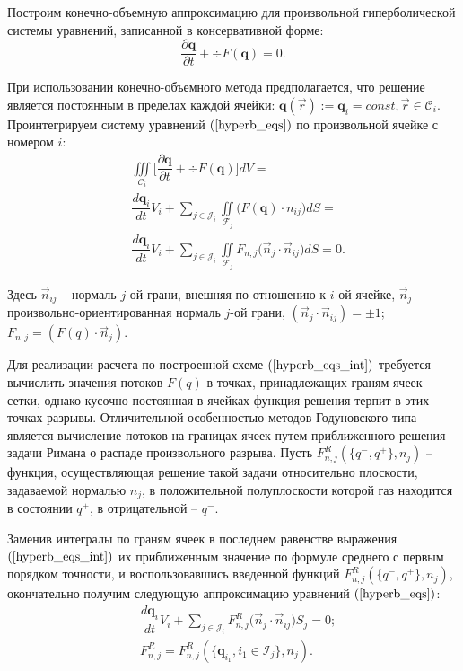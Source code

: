 \documentclass[14pt, a4paper, fleqn]{extreport}
\begin{document}
	Построим конечно-объемную аппроксимацию для
	произвольной гиперболической системы уравнений, записанной в консервативной форме:
	\begin{equation}
		\label{hyperb_eqs}
		\dfrac{\partial \textbf{q}}{\partial t} + \div{F(\textbf{q})} = 0.
	\end{equation}
	
	При использовании конечно-объемного метода предполагается, что решение является 
	постоянным в пределах каждой ячейки: $\textbf{q}(\vec{r}) := \textbf{q}_i = const, \vec{r} \in \mathcal{C}_i$.
	Проинтегрируем систему уравнений $(\ref{hyperb_eqs})$ по произвольной ячейке с номером $i$:
	\begin{equation}
	\label{hyperb_eqs_int}
	\begin{split}
		&\iiint\limits_{\mathcal{C}_i} \Big[
			\dfrac{\partial \textbf{q}}{\partial t} + \div{F(\textbf{q})} \Big]dV = 
		\\
		&\dfrac{d \textbf{q}_i}{d t}V_i
			+ \sum\limits_{j \in \mathcal{J}_i}\iint\limits_{\mathcal{F}_j} \Big( F(\textbf{q}) \cdot n_{ij} \Big) dS =
		\\
		&\dfrac{d \textbf{q}_i}{d t}V_i
			+ \sum\limits_{j \in \mathcal{J}_i}\iint\limits_{\mathcal{F}_j} 
				F_{n,j} \Big( \vec{n}_{j} \cdot \vec{n}_{ij} \Big) dS = 0.
	\end{split}
	\end{equation}
	
	Здесь $\vec{n}_{ij}$ -- нормаль $j$-ой грани, внешняя по отношению к $i$-ой ячейке, 
	$\vec{n}_j$ -- произвольно-ориентированная нормаль $j$-ой грани, $(\vec{n}_{j} \cdot \vec{n}_{ij}) = \pm 1$;
	$F_{n,j} = (F(q) \cdot \vec{n}_{j})$.
	
	Для реализации расчета по построенной схеме $(\ref{hyperb_eqs_int})$ требуется вычислить значения потоков $F(q)$ в точках, 
	принадлежащих граням ячеек сетки, однако кусочно-постоянная в ячейках функция решения терпит в этих точках разрывы.
	Отличительной особенностью методов Годуновского типа является вычисление потоков на границах 
	ячеек путем приближенного решения задачи Римана о распаде произвольного разрыва.
	Пусть $F_{n,j}^R(\lbrace q^{-}, q^{+} \rbrace, n_j)$ -- функция, осуществляющая решение такой задачи относительно плоскости, 
	задаваемой нормалью $n_j$,
	в положительной полуплоскости которой газ находится в состоянии $q^{+}$, в отрицательной -- $q^{-}$.
	
	Заменив интегралы по граням ячеек в последнем равенстве выражения $(\ref{hyperb_eqs_int})$ 
	их приближенным значение по формуле среднего с первым порядком точности,
	и воспользовавшись введенной функций $F_{n,j}^R(\lbrace q^{-}, q^{+} \rbrace, n_j)$,
	окончательно получим следующую аппроксимацию уравнений $(\ref{hyperb_eqs})$:
	\begin{equation}
	\label{hyperb_eqs_god} \boxed{
	\begin{split}
		&\dfrac{d \textbf{q}_i}{d t}V_i
			+ \sum\limits_{j \in \mathcal{J}_i} F_{n,j}^R \Big( \vec{n}_{j} \cdot \vec{n}_{ij} \Big) S_j = 0;
		\\
		&F_{n,j}^R = F_{n,j}^R(\lbrace \textbf{q}_{i_1}, i_1 \in \mathcal{I}_j \rbrace, n_{j}).
	\end{split}}
	\end{equation}
	
\end{document}
